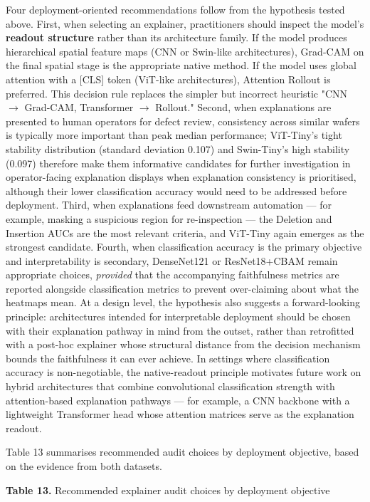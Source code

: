 \documentclass[11pt,a4paper]{article}
\begin{document}
Four deployment-oriented recommendations follow from the hypothesis tested above. First, when selecting an explainer, practitioners should inspect the model's \textbf{readout structure} rather than its architecture family. If the model produces hierarchical spatial feature maps (CNN or Swin-like architectures), Grad-CAM on the final spatial stage is the appropriate native method. If the model uses global attention with a [CLS] token (ViT-like architectures), Attention Rollout is preferred. This decision rule replaces the simpler but incorrect heuristic "CNN $\rightarrow$ Grad-CAM, Transformer $\rightarrow$ Rollout." Second, when explanations are presented to human operators for defect review, consistency across similar wafers is typically more important than peak median performance; ViT-Tiny's tight stability distribution (standard deviation 0.107) and Swin-Tiny's high stability (0.097)
therefore make them informative candidates for further investigation in operator-facing explanation displays when explanation consistency is prioritised, although their lower classification accuracy would need to be addressed before deployment. Third, when explanations feed downstream automation --- for example, masking a suspicious region for re-inspection --- the Deletion and Insertion AUCs are the most relevant criteria, and ViT-Tiny again emerges as the strongest candidate. Fourth, when classification accuracy is the primary objective and interpretability is secondary, DenseNet121 or ResNet18+CBAM remain appropriate choices, \emph{provided} that the accompanying faithfulness metrics are reported alongside classification metrics to prevent over-claiming about what the heatmaps mean. At a design level, the hypothesis also suggests a forward-looking principle: architectures intended for
interpretable deployment should be chosen with their explanation pathway in mind from the outset, rather than retrofitted with a post-hoc explainer whose structural distance from the decision mechanism bounds the faithfulness it can ever achieve. In settings where classification accuracy is non-negotiable, the native-readout principle motivates future work on hybrid architectures that combine convolutional classification strength with attention-based explanation pathways --- for example, a CNN backbone with a lightweight Transformer head whose attention matrices serve as the explanation readout.

Table 13 summarises recommended audit choices by deployment objective, based on the evidence from both datasets.

\begin{center}
\small \textbf{Table 13.} Recommended explainer audit choices by deployment objective
\end{center}
\end{document}
